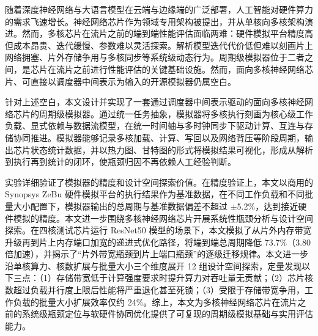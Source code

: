 \begin{chineseabstract}

随着深度神经网络与大语言模型在云端与边缘端的广泛部署，人工智能对硬件算力的需求飞速增长。神经网络芯片作为领域专用架构被提出，并从单核向多核架构演进。然而，多核芯片在流片之前的端到端性能评估面临两难：硬件模拟平台精度高但成本昂贵、迭代缓慢、参数难以灵活探索。解析模型迭代代价低但难以刻画片上网络拥塞、片外存储争用与多核同步等系统级动态行为。周期级模拟器位于二者之间，是芯片在流片之前进行性能评估的关键基础设施。然而，面向多核神经网络芯片、可直接以调度器中间表示为输入的开源模拟器仍属空白。

针对上述空白，本文设计并实现了一套通过调度器中间表示驱动的面向多核神经网络芯片的周期级模拟器。通过统一任务抽象，模拟器将多核执行刻画为核心级工作负载、显式依赖与数据流模型，在统一时间轴与多时钟同步下驱动计算、互连与存储协同推进。模拟器能够记录多核加载、计算、写回以及网络背压等阶段周期，输出芯片状态统计数据，并以热力图、甘特图的形式将模拟结果可视化，形成从解析到执行再到统计的闭环，使瓶颈归因不再依赖人工经验判断。

实验详细验证了模拟器的精度和设计空间探索价值。在精度验证上，本文以商用的 Synopsys ZeBu 硬件模拟平台的执行结果作为基准数据，在不同工作负载和不同批量大小配置下，模拟器输出的总周期与基准数据偏差不超过 $\pm$5.2\%，达到接近硬件模拟的精度。本文进一步围绕多核神经网络芯片开展系统性瓶颈分析与设计空间探索。在四核测试芯片运行 ResNet50 模型的场景下，本文模拟了从片外内存带宽升级再到片上内存端口加宽的递进式优化路径，将端到端总周期降低 73.7\%（3.80 倍加速），并揭示了“片外带宽瓶颈到片上端口瓶颈”的逐级迁移规律。本文进一步沿单核算力、核数扩展与批量大小三个维度展开 12 组设计空间探索，定量发现以下三点：（1）存储带宽低于计算强度要求时提升算力对吞吐量无贡献；（2）芯片核数超过负载并行度上限后性能将严重退化甚至死锁；（3）受限于存储带宽争用，工作负载的批量大小扩展效率仅约 24\%。综上，本文为多核神经网络芯片在流片之前的系统级瓶颈定位与软硬件协同优化提供了可复现的周期级模拟基础与实用评估能力。





\end{chineseabstract}

